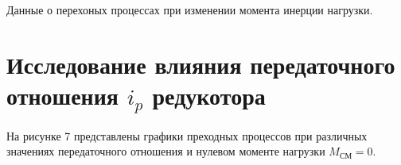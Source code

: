 \documentclass[a4paper, 12pt]{article}
\begin{document}
\begin{table}[h!]
    \centering
    \begin{threeparttable}
        \caption{Данные о перехоных процессах при изменении момента инерции нагрузки.}
    \end{threeparttable}
\end{table}

\newpage
\section{Исследование влияния передаточного отношения $i_p$ редукотора}
На рисунке 7 представлены графики преходных процессов при различных значениях передаточного отношения и нулевом моменте нагрузки $M_\text{СМ} = 0$.
\end{document}
